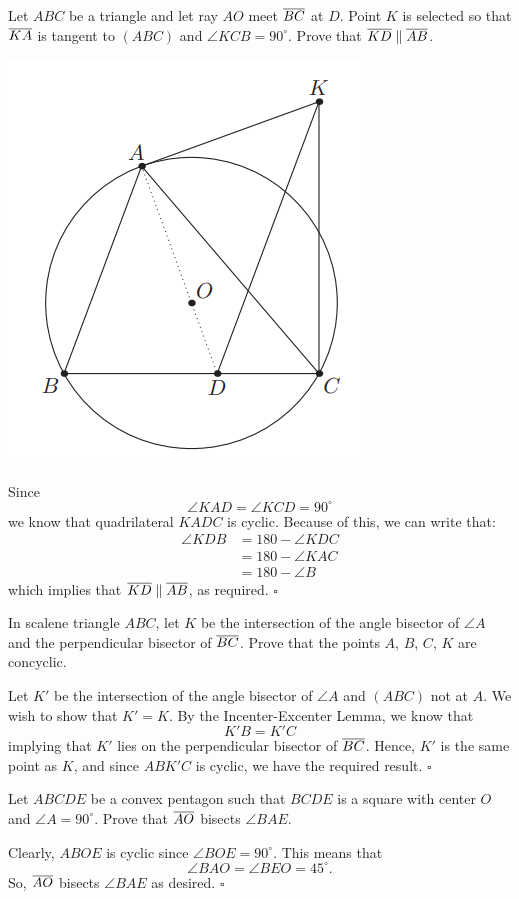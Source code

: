 \documentclass{article}
\begin{document}
\begin{problem}[1.33]{}
Let $ABC$ be a triangle and let ray $AO$ meet $\overline{BC}$ at $D$. Point $K$ is selected so that $\overline{KA}$ is tangent to $(ABC)$ and $\angle KCB = 90^\circ$. Prove that $\overline{KD} \parallel \overline{AB}$.
\end{problem}
\begin{center}
\includegraphics[width=0.4\linewidth]{Figure 1.6B.png}
\end{center}
Since \[\angle KAD = \angle KCD = 90^\circ\] we know that quadrilateral $KADC$ is cyclic. Because of this, we can write that:
\begin{align*}
\angle KDB &= 180-\angle KDC \\
&= 180-\angle KAC \\
&= 180-\angle B
\end{align*}
which implies that $\overline{KD} \parallel \overline{AB}$, as required. $\square$

\begin{problem}[1.34]{}
In scalene triangle $ABC$, let $K$ be the intersection of the angle bisector of $\angle A$ and the perpendicular bisector of $\overline{BC}$. Prove that the points $A$, $B$, $C$, $K$ are concyclic.
\end{problem}

Let $K'$ be the intersection of the angle bisector of $\angle A$ and $(ABC)$ not at $A$. We wish to show that $K' = K$. By the Incenter-Excenter Lemma, we know that \[K'B = K'C\] implying that $K'$ lies on the perpendicular bisector of $\overline{BC}$. Hence, $K'$ is the same point as $K$, and since $ABK'C$ is cyclic, we have the required result. $\square$

\begin{problem}[1.36]{}
Let $ABCDE$ be a convex pentagon such that $BCDE$ is a square with center $O$ and $\angle A = 90^\circ$. Prove that $\overline{AO}$ bisects $\angle BAE$.
\end{problem}
Clearly, $ABOE$ is cyclic since $\angle BOE = 90^\circ$. This means that \[\angle BAO = \angle BEO = 45^\circ.\] So, $\overline{AO}$ bisects $\angle BAE$ as desired. $\square$
\end{document}
